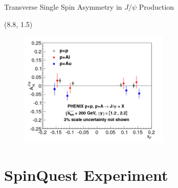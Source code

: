 \documentclass[10pt, xcolor={dvipsnames}, aspectratio = 169]{beamer}
\newcommand{\citeme}[1]{{\tiny \footfullcite{#1}}}
\newcommand{\jpsi}{$J/\psi$ }
\begin{document}
\begin{frame}{Transverse Single Spin Asymmetry in \jpsi Production}

\begin{textblock}{7.0}(8.8, 1.5)

\begin{figure}
    \centering
    \includegraphics[height = 5.5cm]{imgs/final_xf.png}
\end{figure}

\end{textblock}

\end{frame}

%
%

\section{SpinQuest Experiment}
\end{document}
